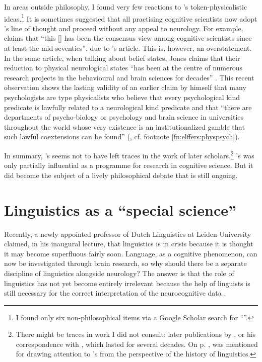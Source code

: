 \documentclass[output=paper]{langscibook}
\begin{document}
In areas outside philosophy, I found very few reactions to {\Fodor}'s token-phys\-i\-cal\-istic ideas.\footnote{I found only six non-philosophical items via a Google Scholar search for ``''.}  It is sometimes suggested that all practising cognitive scientists now adopt {\Fodor}'s line of thought and proceed without any appeal to neurology. For example, \citet{Jones2004}  claims that ``this [] has been the consensus view among cognitive scientists since at least the mid-seventies'', due to {\Fodor}'s \citeyear{Fodor1974} article. This is, however, an overstatement. In the same article, when talking about belief states, Jones claims that their reduction to physical neurological states ``has been at the centre of numerous research projects in the behavioural and brain sciences for decades'' \citep[423]{Jones2004}. This recent observation shows the lasting validity of an earlier claim by {\Fodor} himself that many psychologists are type physicalists who believe that every psychological kind predicate is lawfully related to a neurological kind predicate and that ``there are departments of psycho-biology or psychology and brain science in universities throughout the world whose very existence is an institutionalized gamble that such lawful coextensions can be found'' (\citealt[105]{Fodor1974}, cf. footnote \ref{fn:elffers:physpsych}).

In summary, {\Sapir}'s  seems not to have left traces in the work of later scholars.\footnote{There might be traces in work I did not consult: later publications by {\Kroeber}, or his correspondence with {\Sapir}, which lasted for several decades. On p. \pageref{q:elffers:silversteinref}, \citet{Silverstein1986} was mentioned for drawing attention to {\Sapir}'s  from the perspective of the history of linguistics.} {\Fodor}'s  was only partially influential as a programme for research in cognitive science. But it did become the subject of a lively philosophical debate that is still ongoing.

\section{Linguistics as a ``special science''}
\label{sec:elffers:linguisticsasspecialscience}

Recently, a newly appointed professor of Dutch Linguistics at Leiden University claimed, in his inaugural lecture, that linguistics is in crisis because it is thought it may become superfluous fairly soon. Language, as a cognitive phenomenon, can now be investigated through brain research, so why should there be a separate discipline of linguistics alongside neurology? The answer is that the role of linguistics has not yet become entirely irrelevant because the help of linguists is still necessary for the correct interpretation of the neurocognitive data \citep{Barbiers2017}.
\end{document}
